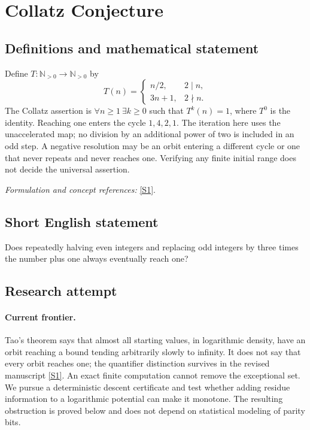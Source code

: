 \documentclass[11pt,a4paper]{article}
\newcommand{\N}{\mathbb{N}}
\newcommand{\sref}[2]{\hyperlink{source:#1:#2}{[S#2]}}
\newif\ifshowcatalogue
\newcommand{\cataloguescope}[1]{\ifshowcatalogue
 \paragraph{Exact scope in the supplied catalogue.}
 \begin{quote}\small #1\end{quote}\fi}
\numberwithin{equation}{section}
\begin{document}
\setcounter{section}{0}
\clearpage
\section*{\texorpdfstring{Collatz Conjecture}{Collatz Conjecture}}\label{9}
\subsection{Definitions and mathematical statement}
Define $T:\N_{>0}\to\N_{>0}$ by
\[
 T(n)=\begin{cases}n/2,&2\mid n,\\3n+1,&2\nmid n.\end{cases}
\]
The Collatz assertion is $\forall n\ge1\ \exists k\ge0$ such that $T^k(n)=1$, where $T^0$ is the identity. Reaching one enters the cycle $1,4,2,1$. The iteration here uses the unaccelerated map; no division by an additional power of two is included in an odd step. A negative resolution may be an orbit entering a different cycle or one that never repeats and never reaches one. Verifying any finite initial range does not decide the universal assertion.
\par\smallskip\textit{Formulation and concept references:} \sref{9}{1}.
\cataloguescope{Prove or disprove that, for every positive integer N, repeated application of N -> N/2 when N is even and N -> 3N+1 when N is odd eventually reaches 1.}
\subsection{Short English statement}
Does repeatedly halving even integers and replacing odd integers by three times the number plus one always eventually reach one?
\subsection{Research attempt}

\paragraph{Current frontier.}
Tao's theorem says that almost all starting values, in logarithmic density, have an orbit reaching a bound tending arbitrarily slowly to infinity. It does not say that every orbit reaches one; the quantifier distinction survives in the revised manuscript \sref{9}{1}. An exact finite computation cannot remove the exceptional set. We pursue a deterministic descent certificate and test whether adding residue information to a logarithmic potential can make it monotone. The resulting obstruction is proved below and does not depend on statistical modeling of parity bits.
\end{document}

